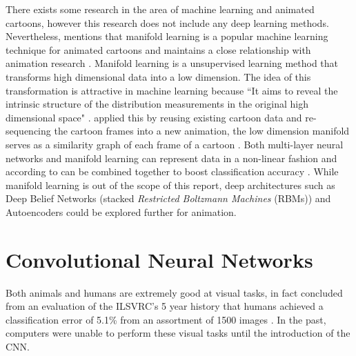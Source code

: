 \documentclass[report, 11pt, oneside]{dissertation}
\begin{document}
There exists some research in the area of machine learning and animated cartoons, however this research does not include any deep learning methods. Nevertheless, \citeauthor{wang:2017} mentions that manifold learning is a popular machine learning technique for animated cartoons and maintains a close relationship with animation research \citeyearpar[3]{wang:2017}. Manifold learning is a unsupervised learning method that transforms high dimensional data into a low dimension. The idea of this transformation is attractive in machine learning because ``It aims to reveal the intrinsic structure of the distribution measurements in the original high dimensional space" \citep{wang:2017}. \citeauthor{deJuan:2004ex} applied this by reusing existing cartoon data and re-sequencing the cartoon frames into a new animation, the low dimension manifold serves as a similarity graph of each frame of a cartoon \citeyearpar{deJuan:2004ex}. Both multi-layer neural networks and manifold learning can represent data in a non-linear fashion and according to \citeauthor{Rajanna:2016ux} can be combined together to boost classification accuracy \citeyearpar{Rajanna:2016ux}. While manifold learning is out of the scope of this report, deep architectures such as Deep Belief Networks (stacked \textit{Restricted Boltzmann Machines} (RBMs)) and Autoencoders could be explored further for animation.

\section{Convolutional Neural Networks}

Both animals and humans are extremely good at visual tasks, in fact \citeauthor{Russakovsky:2014vi} concluded from an evaluation of the ILSVRC's 5 year history that humans achieved a classification error of 5.1\% from an assortment of 1500 images \citeyearpar[31]{Russakovsky:2014vi}. In the past, computers were unable to perform these visual tasks until the introduction of the CNN.
\end{document}
